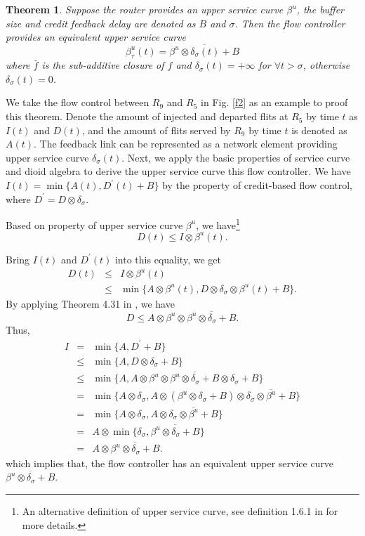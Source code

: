 \documentclass[10pt,journal]{IEEEtran}
\newtheorem{theorem}{Theorem}
\begin{document}
\begin{theorem}\label{credit}
Suppose the router provides an upper service curve $\beta^u$, the buffer size and credit feedback delay are denoted as $B$ and $\sigma$. Then the flow controller provides an equivalent upper service curve $$\beta^{u}_\tau(t)=\overline{\beta^u\otimes\delta_\sigma(t)+B}$$ where $\bar{f}$ is the sub-additive closure of $f$ \cite{Boudec2001Network} and $\delta_\sigma(t)=+\infty$ for $\forall t>\sigma$, otherwise $\delta_\sigma(t)=0$.
\end{theorem}
\begin{IEEEproof}
We take the flow control between $R_9$ and $R_5$ in Fig. \ref{f2} as an example to proof this theorem. Denote the amount of injected and departed flits at $R_5$ by time $t$ as $I(t)$ and $D(t)$, and the amount of flits served by $R_9$ by time $t$ is denoted as $A(t)$. The feedback link can be represented as a network element providing upper service curve $\delta_\sigma(t)$. Next, we apply the basic properties of service curve and dioid algebra to derive the upper service curve this flow controller. We have $I(t)=\min\{A(t),D^\prime(t)+B\}$ by the property of credit-based flow control, where $D^\prime=D\otimes\delta_\sigma$.

Based on property of upper service curve $\beta^u$, we have\footnote{An alternative definition of upper service curve, see definition 1.6.1 in \cite{Boudec2001Network} for more details.}
$$D(t)\leq I\otimes \beta^u(t).$$

Bring $I(t)$ and $D^\prime(t)$ into this equality, we get
\begin{eqnarray*}
D(t)&\leq& I\otimes \beta^u(t)\\
&\leq& \min\{A\otimes \beta^u(t),D\otimes\delta_\sigma\otimes \beta^u(t)+B\}.
\end{eqnarray*}
By applying Theorem 4.31 in \cite{Boudec2001Network}, we have
$$D\leq A\otimes \beta^u\otimes\overline{\beta^u\otimes\delta_\sigma+B}.$$
Thus,
\begin{eqnarray*}
  I&=& \min\{A,D^\prime+B\}\\
  &\leq& \min\{A,D\otimes\delta_\sigma+B\}\\
  &\leq& \min\{A,A\otimes \beta^u\otimes\overline{\beta^u\otimes\delta_\sigma+B}\otimes\delta_\sigma+B\}\\
  &=& \min\{A\otimes \delta_\sigma,A\otimes (\beta^u\otimes\delta_\sigma+B)\otimes\overline{\delta_\sigma\otimes\beta^u+B}\}\\
  &=& \min\{A\otimes \delta_\sigma,A\otimes \overline{\delta_\sigma\otimes\beta^u+B}\}\\
  &=& A\otimes\min\{\delta_\sigma,\overline{\beta^u\otimes\delta_\sigma+B}\}\\
  &=& A\otimes\overline{\beta^u\otimes\delta_\sigma+B}.
\end{eqnarray*}
which implies that, the flow controller has an equivalent upper service curve $\overline{\beta^u\otimes\delta_\sigma+B}$.
\end{IEEEproof}
\end{document}
